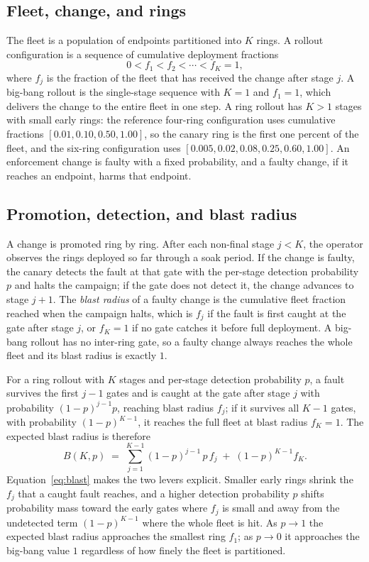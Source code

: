 \documentclass[journal]{IEEEtran}
\begin{document}
\subsection{Fleet, change, and rings}
The fleet is a population of endpoints partitioned into $K$ rings. A rollout configuration is a
sequence of cumulative deployment fractions
\begin{equation}
0 < f_1 < f_2 < \cdots < f_K = 1,
\end{equation}
where $f_j$ is the fraction of the fleet that has received the change after stage $j$. A big-bang
rollout is the single-stage sequence with $K = 1$ and $f_1 = 1$, which delivers the change to the
entire fleet in one step. A ring rollout has $K > 1$ stages with small early rings: the reference
four-ring configuration uses cumulative fractions $[0.01, 0.10, 0.50, 1.00]$, so the canary ring is
the first one percent of the fleet, and the six-ring configuration uses $[0.005, 0.02, 0.08, 0.25,
0.60, 1.00]$. An enforcement change is faulty with a fixed probability, and a faulty change, if it
reaches an endpoint, harms that endpoint.

\subsection{Promotion, detection, and blast radius}
A change is promoted ring by ring. After each non-final stage $j < K$, the operator observes the
rings deployed so far through a soak period. If the change is faulty, the canary detects the fault at
that gate with the per-stage detection probability $p$ and halts the campaign; if the gate does not
detect it, the change advances to stage $j+1$. The \emph{blast radius} of a faulty change is the
cumulative fleet fraction reached when the campaign halts, which is $f_j$ if the fault is first
caught at the gate after stage $j$, or $f_K = 1$ if no gate catches it before full deployment. A
big-bang rollout has no inter-ring gate, so a faulty change always reaches the whole fleet and its
blast radius is exactly $1$.

For a ring rollout with $K$ stages and per-stage detection probability $p$, a fault survives the
first $j-1$ gates and is caught at the gate after stage $j$ with probability $(1-p)^{j-1} p$,
reaching blast radius $f_j$; if it survives all $K-1$ gates, with probability $(1-p)^{K-1}$, it
reaches the full fleet at blast radius $f_K = 1$. The expected blast radius is therefore
\begin{equation}
B(K, p) \;=\; \sum_{j=1}^{K-1} (1-p)^{j-1}\, p\, f_j \;+\; (1-p)^{K-1} f_K .
\label{eq:blast}
\end{equation}
Equation~\eqref{eq:blast} makes the two levers explicit. Smaller early rings shrink the $f_j$ that a
caught fault reaches, and a higher detection probability $p$ shifts probability mass toward the early
gates where $f_j$ is small and away from the undetected term $(1-p)^{K-1}$ where the whole fleet is
hit. As $p \to 1$ the expected blast radius approaches the smallest ring $f_1$; as $p \to 0$ it
approaches the big-bang value $1$ regardless of how finely the fleet is partitioned.
\end{document}
